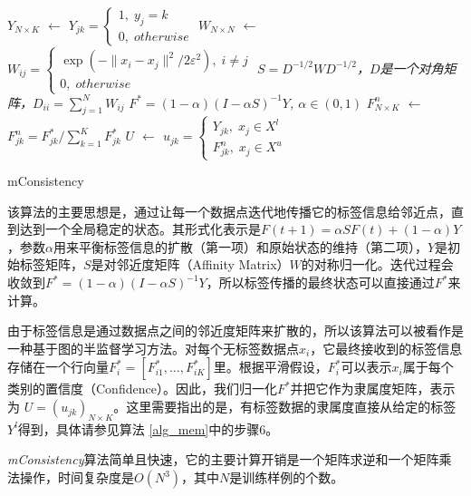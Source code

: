 \IncMargin{1em}
\begin{algorithm}
\BlankLine
\emph{$Y_{N \times K}$ $\leftarrow$ $Y_{jk}=\begin{cases}1,\; y_{j}=k \\0,\; otherwise\end{cases}$}\;
\emph{$W_{N \times N}$ $\leftarrow$ $W_{ij}=\begin{cases}\exp(-\|x_{i}-x_{j}\|^{2}/2\varepsilon^{2}),\; i\neq j \\0,\; otherwise\end{cases}$}\;
\emph{$S=D^{-1/2}WD^{-1/2}$，$D$是一个对角矩阵，$D_{ii}=\sum_{j=1}^{N}W_{ij}$}\;
\emph{$F^{*}=(1-\alpha)(I-\alpha S)^{-1}Y$, $\alpha\in(0,1)$}\;
\emph{$F^{n}_{N \times K}$ $\leftarrow$ $F^{n}_{jk}=F^{*}_{jk}/\sum_{k=1}^{K}F^{*}_{jk}$}\;
\emph{$U$ $\leftarrow$ $u_{jk}=\begin{cases}Y_{jk},\; x_{j}\in X^{l} \\F^{n}_{jk},\; x_{j}\in X^{u}\end{cases}$}\;
\caption{mConsistency}\label{alg_mem}
\end{algorithm}
\DecMargin{1em}

该算法的主要思想是，通过让每一个数据点迭代地传播它的标签信息给邻近点，直到达到一个全局稳定的状态\citep{zhou2004learning}。其形式化表示是\(F(t+1)=\alpha SF(t)+(1-\alpha)Y\)，参数\(\alpha\)用来平衡标签信息的扩散（第一项）和原始状态的维持（第二项），\(Y\)是初始标签矩阵，\(S\)是对邻近度矩阵（Affinity Matrix）\(W\)的对称归一化。迭代过程会收敛到\(F^{*}=(1-\alpha)(I-\alpha S)^{-1}Y\)\citep{zhou2004learning}，所以标签传播的最终状态可以直接通过\(F^{*}\)来计算。

由于标签信息是通过数据点之间的邻近度矩阵来扩散的，所以该算法可以被看作是一种基于图的半监督学习方法。对每个无标签数据点\(x_{i}\)，它最终接收到的标签信息存储在一个行向量\(F^{*}_{i}=[F^{*}_{i1},\dots,F^{*}_{iK}]\)里。根据平滑假设，\(F^{*}_{i}\)可以表示\(x_{i}\)属于每个类别的置信度（Confidence）。因此，我们归一化\(F^{*}\)并把它作为隶属度矩阵，表示为 \(U=(u_{jk})_{N \times K}\)。这里需要指出的是，有标签数据的隶属度直接从给定的标签\(Y^{l}\)得到，具体请参见算法 \ref{alg_mem}中的步骤6。

\textit{mConsistency}算法简单且快速，它的主要计算开销是一个矩阵求逆和一个矩阵乘法操作，时间复杂度是\(O(N^{3})\)，其中\(N\)是训练样例的个数。

